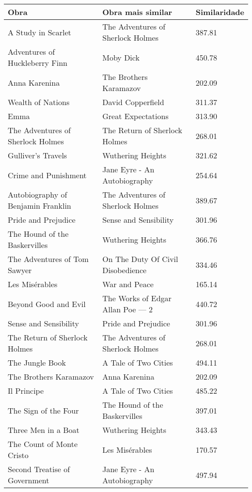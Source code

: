 \documentclass{article}
\begin{document}
\begin{table}[h]
  \begin{center}
    \tiny
    \begin{tabular}{ | l | l | l |}
    \hline
    Obra & Obra mais similar & Similaridade \\ 
    \hline
    A Study in Scarlet & The Adventures of Sherlock Holmes & 387.81 \\
    Adventures of Huckleberry Finn & Moby Dick & 450.78 \\
    Anna Karenina & The Brothers Karamazov & 202.09 \\
    Wealth of Nations & David Copperfield & 311.37 \\
    Emma & Great Expectations & 313.90 \\
    The Adventures of Sherlock Holmes & The Return of Sherlock Holmes & 268.01 \\
    Gulliver's Travels & Wuthering Heights & 321.62 \\
    Crime and Punishment & Jane Eyre - An Autobiography & 254.64 \\
    Autobiography of Benjamin Franklin & The Adventures of Sherlock Holmes & 389.67 \\
    Pride and Prejudice & Sense and Sensibility & 301.96 \\
    The Hound of the Baskervilles & Wuthering Heights & 366.76 \\
    The Adventures of Tom Sawyer & On The Duty Of Civil Disobedience & 334.46 \\
    Les Misérables & War and Peace & 165.14 \\
    Beyond Good and Evil & The Works of Edgar Allan Poe — 2 & 440.72 \\
    Sense and Sensibility & Pride and Prejudice & 301.96 \\
    The Return of Sherlock Holmes & The Adventures of Sherlock Holmes & 268.01 \\
    The Jungle Book & A Tale of Two Cities & 494.11 \\
    The Brothers Karamazov & Anna Karenina & 202.09 \\
    Il Principe & A Tale of Two Cities & 485.22 \\
    The Sign of the Four & The Hound of the Baskervilles & 397.01 \\
    Three Men in a Boat & Wuthering Heights & 343.43 \\
    The Count of Monte Cristo & Les Misérables & 170.57 \\
    Second Treatise of Government & Jane Eyre - An Autobiography & 497.94 \\

\end{tabular}
\end{center}
\end{table}
\end{document}
